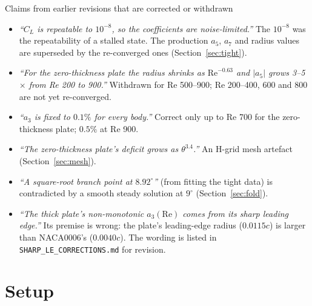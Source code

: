 \documentclass[11pt,a4paper]{article}
\newcommand{\CL}{C_L}
\begin{document}
\begin{warnbox}{Claims from earlier revisions that are corrected or withdrawn}
\begin{itemize}[leftmargin=*]
\item \emph{``$\CL$ is repeatable to $10^{-8}$, so the coefficients are noise-limited.''} The $10^{-8}$ was
  the repeatability of a stalled state. The production $a_5$, $a_7$ and radius values are superseded by
  the re-converged ones (Section~\ref{sec:tight}).
\item \emph{``For the zero-thickness plate the radius shrinks as $\mathrm{Re}^{-0.63}$ and $|a_5|$ grows
  3--5$\times$ from Re 200 to 900.''} Withdrawn for Re 500--900; Re 200--400, 600 and 800 are not yet
  re-converged.
\item \emph{``$a_3$ is fixed to $0.1\%$ for every body.''} Correct only up to Re 700 for the zero-thickness
  plate; $0.5\%$ at Re 900.
\item \emph{``The zero-thickness plate's deficit grows as $\theta^{3.4}$.''} An H-grid mesh artefact
  (Section~\ref{sec:mesh}).
\item \emph{``A square-root branch point at $8.92^\circ$''} (from fitting the tight data) is contradicted
  by a smooth steady solution at $9^\circ$ (Section~\ref{sec:fold}).
\item \emph{``The thick plate's non-monotonic $a_3(\mathrm{Re})$ comes from its sharp leading edge.''} Its
  premise is wrong: the plate's leading-edge radius ($0.0115c$) is larger than NACA0006's ($0.0040c$).
  The wording is listed in \texttt{SHARP\_LE\_CORRECTIONS.md} for revision.
\end{itemize}
\end{warnbox}

\newpage
\section{Setup}
\end{document}

